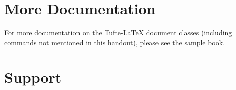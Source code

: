 \documentclass{tufte-handout}
\begin{document}



\section{More Documentation}\label{sec:more-doc}
For more documentation on the Tufte-\LaTeX{} document classes (including commands not
mentioned in this handout), please see the sample book.

\section{Support}\label{sec:support}



\end{document}
